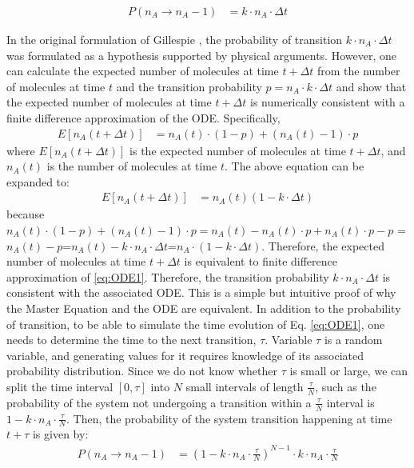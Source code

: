 \documentclass[12pt]{article}
\begin{document}
\begin{align}
P(n_A \rightarrow n_A-1) &= k \cdot n_A \cdot \Delta t
\label{eq:prob}
\end{align}

In the original formulation of Gillespie \cite{Gillespie1977}, the probability of transition $k \cdot n_A \cdot \Delta t$ was formulated as a hypothesis supported by physical arguments. However, one can calculate the expected number of molecules at time $t+\Delta t$ from the number of molecules at time $t$ and the transition probability $p=n_A \cdot k \cdot \Delta t$ and show that the expected number of molecules at time $t+\Delta t$ is numerically consistent with a finite difference approximation of the ODE.  Specifically,
\begin{align}
E[n_A(t+\Delta t)] &= n_A(t) \cdot (1-p) + (n_A(t)-1) \cdot p
\label{eq:expectation}
\end{align}
where $E[n_A(t+\Delta t)]$ is the expected number of molecules at time $t+\Delta t$, and $n_A(t)$ is the number of molecules at time $t$.  The above equation can be expanded to:
\begin{align}
E[n_A(t+\Delta t)] &= n_A(t) (1-k  \cdot \Delta t) 
\label{eq:expectation2}
\end{align}
because $n_A(t) \cdot (1-p) + (n_A(t)-1) \cdot p= n_A(t)-n_A(t) \cdot p + n_A(t) \cdot p -p$ = $n_A(t)-p$=$n_A(t)- k \cdot n_A \cdot \Delta t$=$n_A \cdot (1 - k \cdot \Delta t)$.  Therefore, the expected number of molecules at time $t+\Delta t$ is equivalent to finite difference approximation of \ref{eq:ODE1}.  Therefore, the transition probability $k \cdot n_A \cdot \Delta t$ is consistent with the associated ODE.  This is a simple but intuitive proof of why the Master Equation and the ODE are equivalent.  In addition to the probability of transition, to be able to simulate the time evolution of Eq. \ref{eq:ODE1}, one needs to determine the time to the next transition, $\tau$. Variable $\tau$ is a random variable, and generating values for it requires knowledge of its associated probability distribution.  Since we do not know whether $\tau$ is small or large, we can split the time interval $[0,\tau]$ into $N$ small intervals of length $\frac {\tau} {N}$, such as the probability of the system not undergoing a transition within a $\frac {\tau} {N}$ interval is $1-k \cdot n_A \cdot \frac {\tau} {N}$.  Then, the probability of the system transition happening at time $t+\tau$ is given by:
\begin{align}
P(n_A \rightarrow n_A-1) &= (1-k \cdot n_A \cdot \frac {\tau} {N})^{N-1} \cdot k \cdot n_A \cdot \frac {\tau} {N}
\label{eq:prob2}
\end{align}
\end{document}
